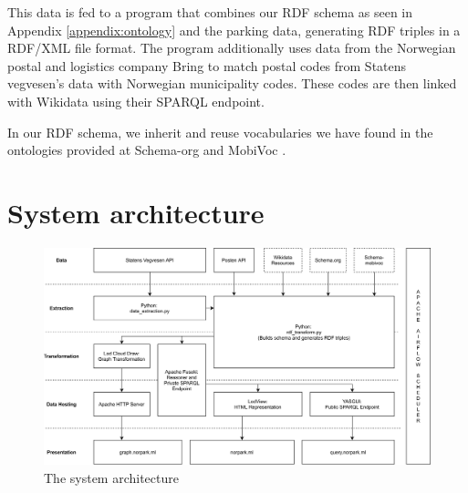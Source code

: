 \vspace{5mm}

This data is fed to a program that combines our RDF schema as seen in Appendix \ref{appendix:ontology} and the parking data, generating RDF triples in a RDF/XML file format. The program additionally uses data from the Norwegian postal and logistics company Bring \cite{bring} to match postal codes from Statens vegvesen's data with Norwegian municipality codes. These codes are then linked with Wikidata \cite{wikidata} using their SPARQL endpoint.

\vspace{5mm}

In our RDF schema, we inherit and reuse vocabularies we have found in the ontologies provided at Schema-org \cite{schema-org} and MobiVoc \cite{schema-mobivoc}.


\section{System architecture}

\begin{figure}[H]
	\centering
	\includegraphics[width=\linewidth]{figures/system-architecture.png}
	\caption{The system architecture}
\end{figure}



